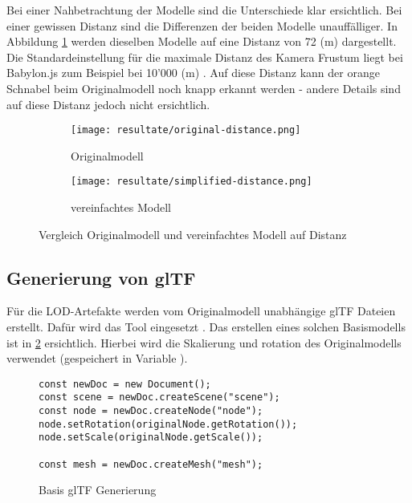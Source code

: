 Bei einer Nahbetrachtung der Modelle sind die Unterschiede klar ersichtlich. Bei einer gewissen Distanz sind die Differenzen der beiden Modelle unauffälliger. In Abbildung \ref{fig:lodComparisonDistance} werden dieselben Modelle auf eine Distanz von 72 (m) dargestellt. Die Standardeinstellung für die maximale Distanz des Kamera Frustum liegt bei Babylon.js zum Beispiel bei 10'000 (m) \cite{babylonMaxZ}. Auf diese Distanz kann der orange Schnabel beim Originalmodell noch knapp erkannt werden - andere Details sind auf diese Distanz jedoch nicht ersichtlich.

\begin{figure}[H]
  \centering
  \begin{subfigure}{.4\textwidth}
    \centering
    \texttt{[image: resultate/original-distance.png]}
    \caption{Originalmodell}
  \end{subfigure}
  \begin{subfigure}{.4\textwidth}
    \centering
    \texttt{[image: resultate/simplified-distance.png]}
    \caption{vereinfachtes Modell}
  \end{subfigure}
  \caption{Vergleich Originalmodell und vereinfachtes Modell auf Distanz}
  \label{fig:lodComparisonDistance}
\end{figure}

\subsection{Generierung von glTF}

Für die LOD-Artefakte werden vom Originalmodell unabhängige glTF Dateien erstellt. Dafür wird das Tool  eingesetzt \cite{gltfTransform}.
Das erstellen eines solchen Basismodells ist in \ref{code:gltfTransform} ersichtlich. Hierbei wird die Skalierung und rotation des Originalmodells verwendet (gespeichert in Variable ).

\begin{figure}[H]
  \begin{lstlisting}[style=JavaScript]
const newDoc = new Document();
const scene = newDoc.createScene("scene");
const node = newDoc.createNode("node");
node.setRotation(originalNode.getRotation());
node.setScale(originalNode.getScale());

const mesh = newDoc.createMesh("mesh");
  \end{lstlisting}
  \caption{Basis glTF Generierung}
  \label{code:gltfTransform}
\end{figure}

